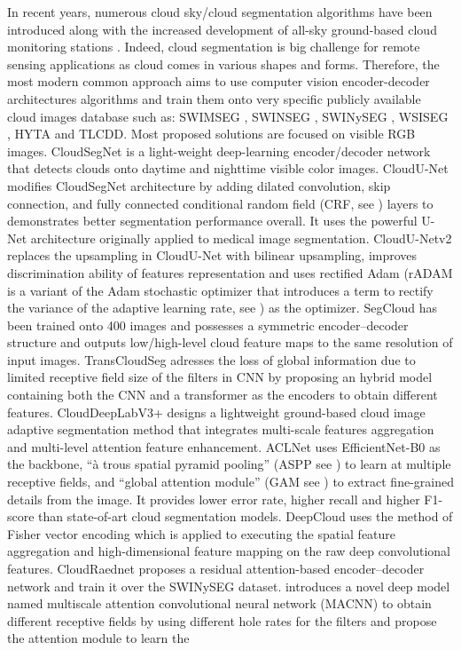 \documentclass[amt, article]{copernicus}
\begin{document}
In recent years, numerous cloud sky/cloud segmentation algorithms have been introduced along with the increased development of all-sky ground-based cloud monitoring stations \citep{Long2006, Yang2012, rs12111902, ASC2, Mommert2020, amt-15-3629-2022}.
Indeed, cloud segmentation is big challenge for remote sensing applications as cloud comes in various shapes and forms. Therefore, the most modern common approach aims to use computer vision encoder-decoder architectures algorithms and train them onto very specific publicly available cloud images database such as: SWIMSEG \citep{dev2016colorbased}, SWINSEG \citep{SWINSEG, dev2017nighttime}, SWINySEG \citep{dev2019cloudsegnet}, WSISEG \citep{SegCloud}, HYTA \citep{HYTA} and TLCDD. Most proposed solutions are focused on visible RGB images. CloudSegNet \citep{dev2019cloudsegnet} is a light-weight deep-learning encoder/decoder network that detects clouds onto daytime and nighttime visible color images. CloudU-Net \citep{CloudUNet} modifies CloudSegNet architecture by adding dilated convolution, skip connection, and fully connected conditional random field (CRF, see \citet{McCallumCRF}) layers to demonstrates better segmentation performance overall. It uses the powerful U-Net architecture \citep{UNET} originally applied to medical image segmentation. CloudU-Netv2 \citep{CloudUNetv2} replaces the upsampling in CloudU-Net with bilinear upsampling, improves discrimination ability of features representation and uses rectified Adam (rADAM is a variant of the Adam \cite{ADAM} stochastic optimizer that introduces a term to rectify the variance of the adaptive learning rate, see \citealt{RADAM}) as the optimizer. SegCloud \citep{SegCloud} has been trained onto 400 images and possesses a symmetric encoder–decoder structure and outputs low/high-level cloud feature maps to the same resolution of input images. TransCloudSeg \citep{TransCloudSeg} adresses the loss of global information due to limited receptive field size of the filters in CNN by proposing an hybrid model containing both the CNN and a transformer \citep{TRANSFORMER} as the encoders to obtain different features. CloudDeepLabV3+ \citep{CloudDeepLabV3} designs a lightweight ground-based cloud image adaptive segmentation method  that integrates multi-scale fea­tures aggregation and multi-level attention feature enhancement. ACLNet \citep{makwana2022aclnet} uses EfficientNet-B0 as the backbone, “à trous spatial pyramid pooling” (ASPP see \citealt{ATROUS}) to learn at multiple receptive fields, and “global attention module” (GAM see \citealt{GAM}) to extract fine-grained details from the image. It provides lower error rate, higher recall and higher F1-score than state-of-art cloud segmentation models. DeepCloud \citep{DeepCloud} uses the method of Fisher vector encoding which is applied to executing the spatial feature aggregation and high-dimensional feature mapping on the raw deep convolutional features. CloudRaednet \citep{shi2022cloudraednet} proposes a residual attention-based encoder–decoder network and train it over the SWINySEG dataset. \citealt{MACNN} introduces a novel deep model named multiscale attention convolutional neural network (MACNN) to obtain different receptive fields by using different hole rates for the filters and propose the attention module to learn the 
\end{document}
